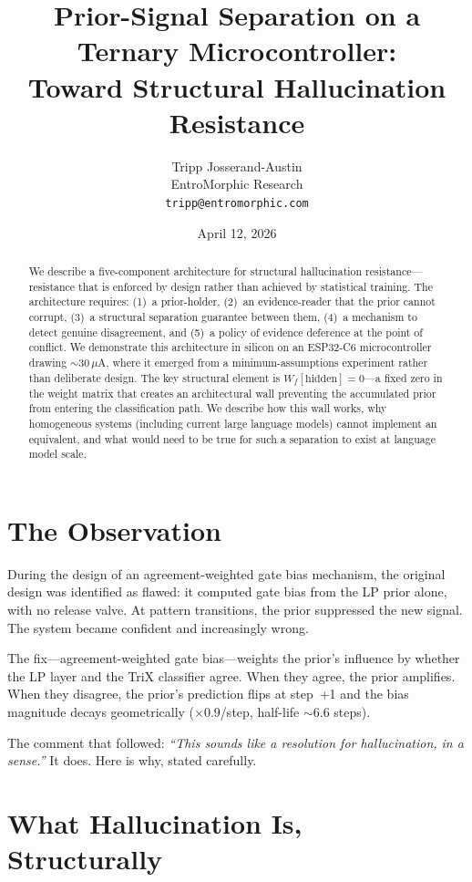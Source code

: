 \documentclass[11pt,letterpaper]{article}
\title{Prior-Signal Separation on a Ternary Microcontroller:\\Toward Structural Hallucination Resistance}
\author{Tripp Josserand-Austin\\EntroMorphic Research\\\texttt{tripp@entromorphic.com}}
\date{April 12, 2026}
\begin{document}
\maketitle

\begin{abstract}
We describe a five-component architecture for structural hallucination resistance---resistance that is enforced by design rather than achieved by statistical training. The architecture requires: (1)~a prior-holder, (2)~an evidence-reader that the prior cannot corrupt, (3)~a structural separation guarantee between them, (4)~a mechanism to detect genuine disagreement, and (5)~a policy of evidence deference at the point of conflict. We demonstrate this architecture in silicon on an ESP32-C6 microcontroller drawing $\sim$30\,$\mu$A, where it emerged from a minimum-assumptions experiment rather than deliberate design. The key structural element is $W_f[\text{hidden}] = 0$---a fixed zero in the weight matrix that creates an architectural wall preventing the accumulated prior from entering the classification path. We describe how this wall works, why homogeneous systems (including current large language models) cannot implement an equivalent, and what would need to be true for such a separation to exist at language model scale.
\end{abstract}

\section{The Observation}

During the design of an agreement-weighted gate bias mechanism, the original design was identified as flawed: it computed gate bias from the LP prior alone, with no release valve. At pattern transitions, the prior suppressed the new signal. The system became confident and increasingly wrong.

The fix---agreement-weighted gate bias---weights the prior's influence by whether the LP layer and the TriX classifier agree. When they agree, the prior amplifies. When they disagree, the prior's prediction flips at step~+1 and the bias magnitude decays geometrically ($\times 0.9$/step, half-life $\sim$6.6 steps).

The comment that followed: \textit{``This sounds like a resolution for hallucination, in a sense.''} It does. Here is why, stated carefully.

\section{What Hallucination Is, Structurally}
\end{document}
